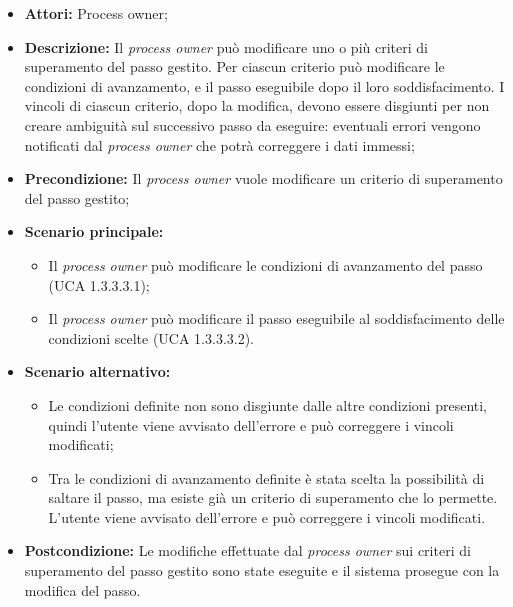 \begin{itemize}
\item \textbf{Attori:} Process owner;
\item \textbf{Descrizione:}
Il \textit{process owner} può modificare uno o più criteri di superamento del passo gestito.
Per ciascun criterio può modificare le condizioni di avanzamento, e il passo eseguibile dopo il loro soddisfacimento.
I vincoli di ciascun criterio, dopo la modifica, devono essere disgiunti per non creare ambiguità sul successivo passo da eseguire: eventuali
errori vengono notificati dal \textit{process owner} che potrà correggere i dati immessi;
\item \textbf{Precondizione:}
Il \textit{process owner} vuole modificare un criterio di superamento del passo gestito;
\item \textbf{Scenario principale:}
\begin{itemize}
\item Il \textit{process owner} può modificare le condizioni di avanzamento del passo (UCA 1.3.3.3.1);
\item Il \textit{process owner} può modificare il passo eseguibile al soddisfacimento delle condizioni scelte (UCA 1.3.3.3.2).
\end{itemize}
\item \textbf{Scenario alternativo:}
\begin{itemize}
\item Le condizioni definite non sono disgiunte dalle altre condizioni presenti, quindi l'utente viene avvisato dell'errore e può correggere i vincoli modificati;
\item Tra le condizioni di avanzamento definite è stata scelta la possibilità di saltare il passo, ma esiste già un criterio di superamento che lo permette. L'utente viene avvisato dell'errore e può correggere i vincoli modificati.
\end{itemize}
\item \textbf{Postcondizione:}
Le modifiche effettuate dal \textit{process owner} sui criteri di superamento del passo gestito sono state eseguite e il sistema prosegue con la modifica del passo.
\end{itemize}

\hypertarget{A1.3.3.3.1}{}
